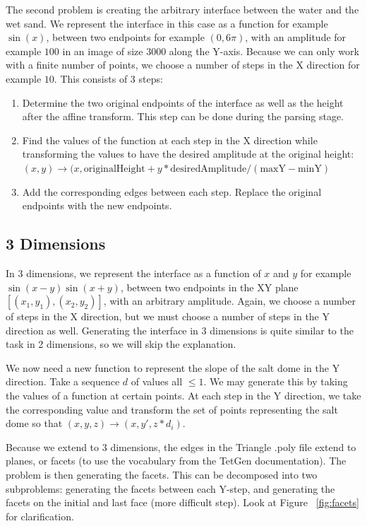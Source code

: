 The second problem is creating the arbitrary interface between the water and the wet sand. We represent the interface in this case as a function for example $\sin(x)$, between two endpoints for example $(0, 6\pi)$, with an amplitude for example $100$ in an image of size $3000$ along the Y-axis. Because we can only work with a finite number of points, we choose a number of steps in the X direction for example $10$. This consists of 3 steps:

\begin{enumerate}
\item Determine the two original endpoints of the interface as well as the height after the affine transform. This step can be done during the parsing stage.
\item Find the values of the function at each step in the X direction while transforming the values to have the desired amplitude at the original height: $(x,y) \rightarrow (x, \text{originalHeight} + y * \text{desiredAmplitude} / (\text{maxY} - \text{minY})$
\item Add the corresponding edges between each step. Replace the original endpoints with the new endpoints.
\end{enumerate}

\subsection{3 Dimensions}




In 3 dimensions, we represent the interface as a function of $x$ and $y$ for example $\sin(x-y) \sin(x+y)$, between two endpoints in the XY plane $[(x_1,y_1),(x_2,y_2)]$, with an arbitrary amplitude. Again, we choose a number of steps in the X direction, but we must choose a number of steps in the Y direction as well. Generating the interface in 3 dimensions is quite similar to the task in 2 dimensions, so we will skip the explanation.

We now need a new function to represent the slope of the salt dome in the Y direction. Take a sequence $d$ of values all $\leq 1$. We may generate this by taking the values of a function at certain points. At each step in the Y direction, we take the corresponding value and transform the set of points representing the salt dome so that $(x,y,z) \rightarrow (x,y',z * d_i)$.

Because we extend to 3 dimensions, the edges in the Triangle .poly file extend to planes, or facets (to use the vocabulary from the TetGen documentation). The problem is then generating the facets. This can be decomposed into two subproblems: generating the facets between each Y-step, and generating the facets on the initial and last face (more difficult step). Look at Figure ~\ref{fig:facets} for clarification.

